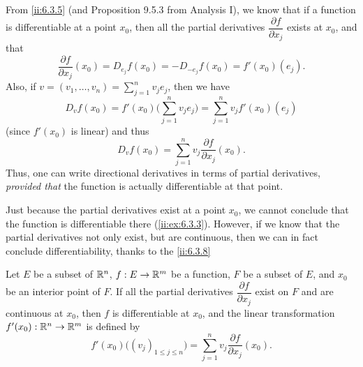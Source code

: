 \begin{ac}\label{ii:ac:6.3.2}
  From \cref{ii:6.3.5} (and Proposition 9.5.3 from Analysis I), we know that if a function is differentiable at a point \(x_0\), then all the partial derivatives \(\dfrac{\partial f}{\partial x_j}\) exists at \(x_0\), and that
  \[
    \dfrac{\partial f}{\partial x_j}(x_0) = D_{e_j} f(x_0) = - D_{-e_j} f(x_0) = f'(x_0)(e_j).
  \]
  Also, if \(v = (v_1, \dots, v_n) = \sum_{j = 1}^n v_j e_j\), then we have
  \[
    D_v f(x_0) = f'(x_0) \bigg(\sum_{j = 1}^n v_j e_j\bigg) = \sum_{j = 1}^n v_j f'(x_0)(e_j)
  \]
  (since \(f'(x_0)\) is linear) and thus
  \[
    D_v f(x_0) = \sum_{j = 1}^n v_j \dfrac{\partial f}{\partial x_j}(x_0).
  \]
  Thus, one can write directional derivatives in terms of partial derivatives, \emph{provided that} the function is actually differentiable at that point.
\end{ac}

\begin{note}
  Just because the partial derivatives exist at a point \(x_0\), we cannot conclude that the function is differentiable there (\cref{ii:ex:6.3.3}).
  However, if we know that the partial derivatives not only exist, but are continuous, then we can in fact conclude differentiability, thanks to the \cref{ii:6.3.8}
\end{note}

\begin{thm}\label{ii:6.3.8}
  Let \(E\) be a subset of \(\mathbb{R}^n\), \(f : E \to \mathbb{R}^m\) be a function, \(F\) be a subset of \(E\), and \(x_0\) be an interior point of \(F\).
  If all the partial derivatives \(\dfrac{\partial f}{\partial x_j}\) exist on \(F\) and are continuous at \(x_0\), then \(f\) is differentiable at \(x_0\), and the linear transformation \(f'(x_0) : \mathbb{R}^n \to \mathbb{R}^m\) is defined by
  \[
    f'(x_0)\big((v_j)_{1 \leq j \leq n}\big) = \sum_{j = 1}^n v_j \dfrac{\partial f}{\partial x_j}(x_0).
  \]
\end{thm}

